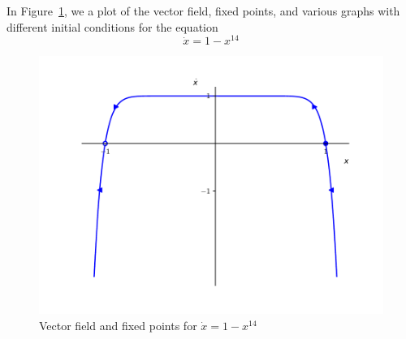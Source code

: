 
In Figure~\ref{fig2_2_2vecfield}, we a plot of the vector field, fixed points,
and various graphs with different initial conditions for the equation 
\[
    \dot{x} = 1 - x^{14}
\]
\begin{figure}[!ht]
    \includegraphics[scale=0.6, center]{../plots/ch02/ex2_2_2.pdf}
    \caption{Vector field and fixed points for $\dot{x} = 1 - x^{14}$\label{fig2_2_2vecfield}}
\end{figure}
